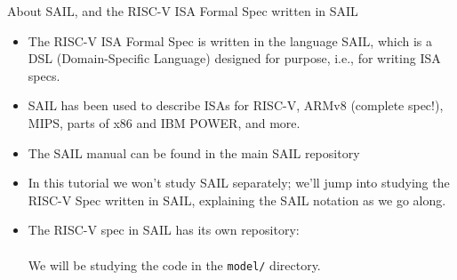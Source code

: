 \documentclass[aspectratio=169]{beamer}
\newcommand{\hmm}{\hspace*{2em}}
\begin{document}
\begin{frame}
  \small

  \begin{block}{About SAIL, and the RISC-V ISA Formal Spec written in SAIL}
    \begin{itemize}

      \item The RISC-V ISA Formal Spec is written in the language
        SAIL, which is a DSL (Domain-Specific Language) designed for
        purpose, i.e., for writing ISA specs.

      \item SAIL has been used to describe ISAs for RISC-V, ARMv8
        (complete spec!), MIPS, parts of x86 and IBM POWER, and more.

      \item The SAIL manual can be found in the main SAIL repository \\
        \hmm {\tt https://github.com/rems-project/sail}

      \item In this tutorial we won't study SAIL separately; we'll
        jump into studying the RISC-V Spec written in SAIL, explaining
        the SAIL notation as we go along.

      \item The RISC-V spec in SAIL has its own repository: \\
        \hmm {\tt https://github.com/rems-project/sail-riscv} \\
        We will be studying the code in the {\tt model/} directory.

    \end{itemize}
  \end{block}

\end{frame}

\end{document}
